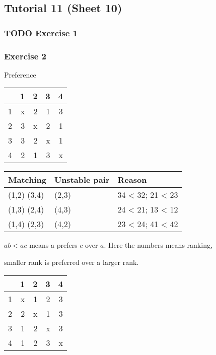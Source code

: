 \documentclass[11pt]{article}
\begin{document}
\subsection{Tutorial 11 (Sheet 10)}
\label{sec:org4d96dda}
\subsubsection{{\bfseries\sffamily TODO} Exercise 1}
\label{sec:orgf4ec75b}
\subsubsection{Exercise 2}
\label{sec:org9b37cae}
Preference

\begin{center}
\begin{tabular}{rrrrr}
 & 1 & 2 & 3 & 4\\
\hline
1 & x & 2 & 1 & 3\\
2 & 3 & x & 2 & 1\\
3 & 3 & 2 & x & 1\\
4 & 2 & 1 & 3 & x\\
\end{tabular}
\end{center}

\begin{center}
\begin{tabular}{lll}
Matching & Unstable pair & Reason\\
\hline
(1,2) (3,4) & (2,3) & 34 < 32; 21 < 23\\
(1,3) (2,4) & (4,3) & 24 < 21; 13 < 12\\
(1,4) (2,3) & (4,2) & 23 < 24; 41 < 42\\
\end{tabular}
\end{center}


\(ab < ac\) means a prefers \(c\) over \(a\). Here the numbers means ranking,

smaller rank is preferred over a larger rank.

\begin{center}
\begin{tabular}{rrrrr}
 & 1 & 2 & 3 & 4\\
\hline
1 & x & 1 & 2 & 3\\
2 & 2 & x & 1 & 3\\
3 & 1 & 2 & x & 3\\
4 & 1 & 2 & 3 & x\\
\end{tabular}
\end{center}
\end{document}
